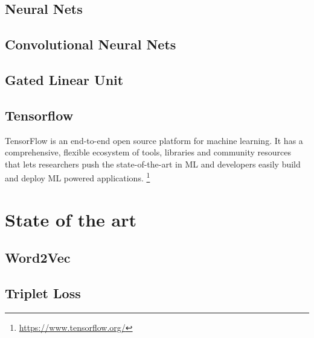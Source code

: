 \subsection{Neural Nets}
\label{sub:Neural-Nets}

\subsection{Convolutional Neural Nets}
\label{sub:Convolutional-Neural-Nets}

\subsection{Gated Linear Unit}
\label{sub:Gated-Linear-Unit}

\subsection{Tensorflow}
\label{sub:Tensorflow}

TensorFlow is an end-to-end open source platform for machine learning. It has a comprehensive, flexible ecosystem of tools, libraries and community resources that lets researchers push the state-of-the-art in \gls{ML} and developers easily build and deploy \gls{ML} powered applications. \footnote{\url{https://www.tensorflow.org/}}

\section{State of the art}
\label{sec:State-of-art}

\subsection{Word2Vec}
\label{sub:word2wec}

\subsection{Triplet Loss}
\label{sub:Triplet-Loss}

